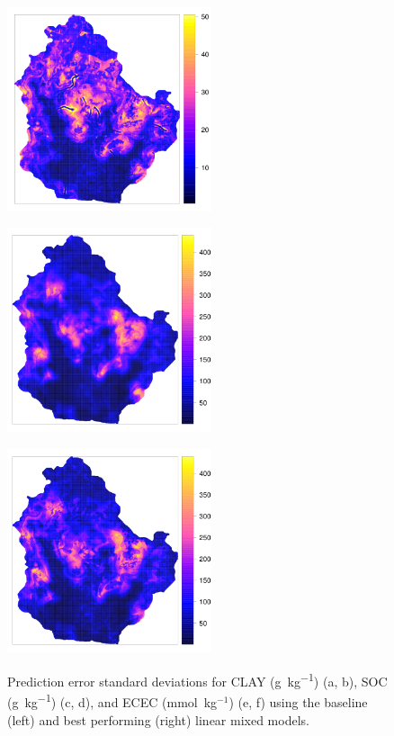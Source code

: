 \begin{figure}[!ht]
\begin{minipage}[b]{63mm}
      \subcaption{}
      \label{fig:soc-best-var}
      \centering
      \includegraphics[width=60mm]{chap01FIG8e}
    \end{minipage}
    \begin{minipage}[b]{63mm}
      \subcaption{}
      \label{fig:ecec-base-var}
      \centering
      \includegraphics[width=60mm]{chap01FIG8c}
    \end{minipage}
    \begin{minipage}[b]{63mm}
      \subcaption{}
      \label{fig:ecec-best-var}
      \centering
      \includegraphics[width=60mm]{chap01FIG8f}
    \end{minipage}
  \caption{Prediction error standard deviations for CLAY (\si{\gram\per\kilo\gram}) (a, b), SOC 
(\si{\gram\per\kilo\gram}) (c, d), and ECEC (mmol~kg$^{-1}$) (e, f) using the baseline (left) and best 
performing (right) linear mixed models.}
  \label{fig:kriging-variance}
\end{figure}

